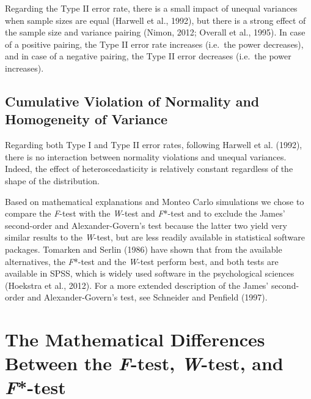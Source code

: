 \documentclass[man,floatsintext]{apa6}
\begin{document}
Regarding the Type II error rate, there is a small impact of unequal variances when sample sizes are equal (Harwell et al., 1992), but there is a strong effect of the sample size and variance pairing (Nimon, 2012; Overall et al., 1995). In case of a positive pairing, the Type II error rate increases (i.e.~the power decreases), and in case of a negative pairing, the Type II error decreases (i.e.~the power increases).

\hypertarget{cumulative-violation-of-normality-and-homogeneity-of-variance}{%
\subsection{Cumulative Violation of Normality and Homogeneity of Variance}\label{cumulative-violation-of-normality-and-homogeneity-of-variance}}

Regarding both Type I and Type II error rates, following Harwell et al. (1992), there is no interaction between normality violations and unequal variances. Indeed, the effect of heteroscedasticity is relatively constant regardless of the shape of the distribution.

Based on mathematical explanations and Monteo Carlo simulations we chose to compare the \emph{F}-test with the \emph{W}-test and \emph{F}*-test and to exclude the James' second-order and Alexander-Govern's test because the latter two yield very similar results to the \emph{W}-test, but are less readily available in statistical software packages. Tomarken and Serlin (1986) have shown that from the available alternatives, the \emph{F}*-test and the \emph{W}-test perform best, and both tests are available in SPSS, which is widely used software in the psychological sciences (Hoekstra et al., 2012). For a more extended description of the James' second-order and Alexander-Govern's test, see Schneider and Penfield (1997).

\hypertarget{the-mathematical-differences-between-the-f-test-w-test-and-f-test}{%
\section{\texorpdfstring{The Mathematical Differences Between the \emph{F}-test, \emph{W}-test, and \emph{F}*-test}{The Mathematical Differences Between the F-test, W-test, and F*-test}}\label{the-mathematical-differences-between-the-f-test-w-test-and-f-test}}
\end{document}
